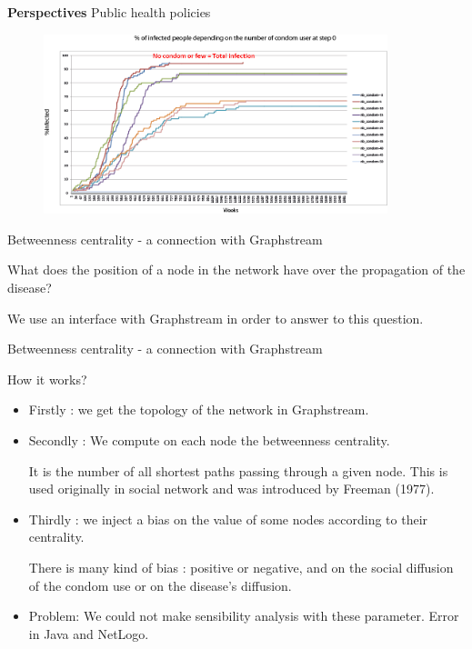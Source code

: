 \documentclass{beamer}
\begin{document}
\begin{frame}{\bf{Perspectives}}
	Public health policies
	\begin{figure}[H]
		\centering
		\includegraphics[width=10.0cm]{./img/infected_time_condomuser(2).png}
	\end{figure}
\end{frame}

\begin{frame}{Betweenness centrality - a connection with Graphstream}
	\begin{block}{What does the position of a node in the network have over the propagation of the disease?}
		\begin{center}
			We use an interface with Graphstream in order to answer to this question.
		\end{center}
	\end{block}
\end{frame}

\begin{frame}{Betweenness centrality - a connection with Graphstream}
	\begin{block}{How it works?}
		\begin{itemize}
			\item Firstly : we get the topology of the network in Graphstream.
			\item Secondly : We compute on each node the betweenness centrality.

It is the number of all shortest paths passing through a given node. This is used originally in social network and was introduced by Freeman (1977).

			\item Thirdly : we inject a bias on the value of some nodes according to their centrality.

There is many kind of bias : positive or negative, and on the social diffusion of the condom use or on the disease's diffusion.

			\item Problem: We could not make sensibility analysis with these parameter. Error in Java and NetLogo.
		\end{itemize}
	\end{block}
\end{frame}
\end{document}
